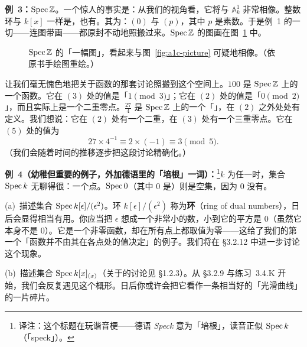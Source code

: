 \textbf{例~3：}$\operatorname{Spec}\mathbb{Z}$。一个惊人的事实是：从我们的视角看，它将与\trAffineLine{} $\mathbb{A}^1_k$ 非常相像。整数环与 $k[x]$ 一样是\trUFD，也有\trDivisionAlgorithm。其\trPrimeIdeal{}为：$(0)$ 与 $(p)$，其中 $p$ 是素数。于是例~1 的一切——连图带画——都原封不动地照搬过来。$\operatorname{Spec}\mathbb{Z}$ 的图画在图~\ref{fig:spec-z-picture} 中。

\begin{figure}[htbp]
\centering
{}
\caption{$\operatorname{Spec}\mathbb{Z}$ 的「一幅图」，看起来与图~\ref{fig:a1c-picture} 可疑地相像。（依原书手绘图重绘。）}\label{fig:spec-z-picture}
\end{figure}

让我们毫无愧色地把关于函数的那套讨论照搬到这个空间上。$100$ 是 $\operatorname{Spec}\mathbb{Z}$ 上的一个函数。它在 $(3)$ 处的值是「$1\pmod{3}$」；它在 $(2)$ 处的值是「$0\pmod{2}$」，而且实际上是一个二重零点。$\frac{27}{4}$ 是 $\operatorname{Spec}\mathbb{Z}$ 上的一个「\trRationalFunction」，在 $(2)$ 之外处处有定义。我们想说：它在 $(2)$ 处有一个二重\trPole，在 $(3)$ 处有一个三重零点。它在 $(5)$ 处的值为
\[
27\times 4^{-1}\equiv 2\times(-1)\equiv 3\pmod{5}.
\]
（我们会随着时间的推移逐步把这段讨论精确化。）

\textbf{例~4（幼稚但重要的例子，外加德语里的「培根」一词）：}\footnote{译注：这个标题在玩谐音梗——德语 \emph{Speck} 意为「培根」，读音正似 $\operatorname{Spec} k$（「speck」）。}$k$ 为任一\trField{}时，集合 $\operatorname{Spec} k$ 无聊得很：一个点。$\operatorname{Spec} 0$（其中 $0$ 是\trZeroRing）则是空集，因为 $0$ 没有\trPrimeIdeal。

\begin{exercise}[关于小概形的小练习]\label{ex:small-schemes-dual-numbers}
(a)~描述集合 $\operatorname{Spec} k[\epsilon]/(\epsilon^2)$。环 $k[\epsilon]/(\epsilon^2)$ 称为\textbf{\trDualNumbers{}环}（ring of dual numbers），日后会显得相当有用。你应当把 $\epsilon$ 想成一个非常小的数，小到它的平方是 $0$（虽然它本身不是 $0$）。它是一个非零函数，却在所有点上都取值为零——这给了我们的第一个「函数并不由其在各点处的值决定」的例子。我们将在 \S3.2.12 中进一步讨论这个现象。

(b)~描述集合 $\operatorname{Spec} k[x]_{(x)}$（关于\trLocalization{}的讨论见 \S1.2.3）。从 \S3.2.9 与练习~3.4.K 开始，我们会反复遇见这个概形。日后你或许会把它看作一条相当好的「光滑曲线」的一片碎片。
\end{exercise}

